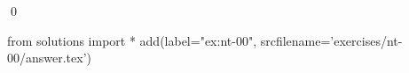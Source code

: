 
\begin{ex} 
  \label{ex:nt-00}
  
  \qed
\end{ex} 
\begin{python0}
from solutions import *
add(label="ex:nt-00",
    srcfilename='exercises/nt-00/answer.tex') 
\end{python0}
